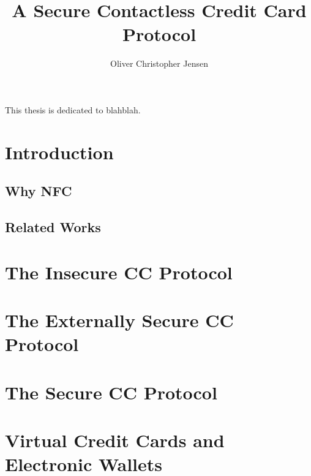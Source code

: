 \documentclass[12pt]{report}
\author{Oliver Christopher Jensen}
\title{A Secure Contactless Credit Card Protocol}
\begin{document}
\copyrightpage
\commcertpage
\titlepage

\begin{dedication}
%
This thesis is dedicated to blahblah.
\end{dedication}

\begin{acknowledgments}		%
%

\end{acknowledgments}

\utabstract
{}
\indent


\tableofcontents
\listoftables
\listoffigures

\chapter{Introduction}
\label{cha:intro}
\section{Why NFC}
\section{Related Works}

\chapter{The Insecure CC Protocol}
\label{cha:insecure}





\chapter{The Externally Secure CC Protocol}
\label{cha:external}




\chapter{The Secure CC Protocol}
\label{cha:secure}




\chapter{Virtual Credit Cards and Electronic Wallets}
\label{cha:electronic}

\end{document}
